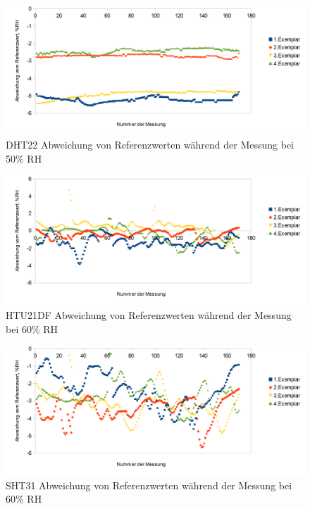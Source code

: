 \documentclass[runningheads]{llncs}
\begin{document}
\begin{figure}[h]
\includegraphics[width=\textwidth]{pictures/DHT22_50.png}
\caption{DHT22 Abweichung von Referenzwerten während der Messung bei 50\% RH}
\end{figure}

\begin{figure}[h]
\includegraphics[width=\textwidth]{pictures/HTU21D_60.png}
\caption{HTU21DF Abweichung von Referenzwerten während der Messung bei 60\% RH}
\end{figure}

\begin{figure}[h]
\includegraphics[width=\textwidth]{pictures/SHT31_60.png}
\caption{SHT31 Abweichung von Referenzwerten während der Messung bei 60\% RH}
\end{figure}
\end{document}

